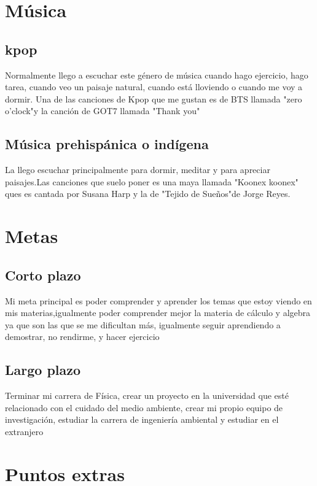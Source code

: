 \documentclass[letterpaper,12pt]{article}
\begin{document}
\section{\Huge {Música}}
 \subsection{\Large {kpop}}
  \tiny Normalmente llego a escuchar este género de música cuando hago {\scriptsize ejercicio}, hago {\scriptsize tarea}, cuando veo un {\scriptsize paisaje natural}, cuando está {\scriptsize lloviendo} o cuando me voy a {\scriptsize dormir}. Una de las canciones de Kpop que me gustan es de \scriptsize BTS llamada  "zero o’clock"y la canción de \scriptsize GOT7 llamada "Thank you"
  \subsection{\Large {Música prehispánica o indígena}}
 {\footnotesize La llego escuchar principalmente para {\Huge dormir, meditar} y para {\Huge apreciar paisajes}.Las canciones que suelo poner es una maya llamada {\Huge"Koonex koonex" ques es cantada por  Susana Harp} y la de  {\Huge"Tejido de Sueños"de  Jorge Reyes.}}
\section{\Huge {Metas}}
\subsection{\Large {Corto plazo}}
{\Large Mi meta principal es poder comprender y aprender los temas que estoy viendo en mis materias,igualmente poder {\Huge comprender} mejor la materia de {\Huge cálculo y algebra} ya que son las que se me dificultan más, igualmente seguir {\Huge aprendiendo a demostrar}, {\Huge no rendirme}, y hacer {\Huge ejercicio}}
\subsection{\Large {Largo plazo}}
 {\normalsize {\huge Terminar mi carrera de Física}, crear un proyecto en la universidad que esté relacionado con el { cuidado del medio ambiente}, crear mi propio {\huge equipo de investigación}, estudiar la carrera de {\huge ingeniería ambiental} y {\huge estudiar en el extranjero}}
\section{\Huge {Puntos extras}}
\end{document}
